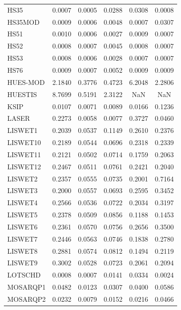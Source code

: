 \begin{longtable}{lccccc}
HS35     &   0.0007 &   0.0005 &   0.0288 &   0.0308 &   0.0008 \\
HS35MOD  &   0.0009 &   0.0006 &   0.0048 &   0.0007 &   0.0307 \\
HS51     &   0.0010 &   0.0006 &   0.0027 &   0.0009 &   0.0007 \\
HS52     &   0.0008 &   0.0007 &   0.0045 &   0.0008 &   0.0007 \\
HS53     &   0.0008 &   0.0006 &   0.0028 &   0.0007 &   0.0007 \\
HS76     &   0.0009 &   0.0007 &   0.0052 &   0.0009 &   0.0009 \\
HUES-MOD &   2.1840 &   0.3776 &   0.4723 &   6.2048 &   2.2806 \\
HUESTIS  &   8.7699 &   0.5191 &   2.3122 &      NaN &      NaN \\
KSIP     &   0.0107 &   0.0071 &   0.0089 &   0.0166 &   0.1236 \\
LASER    &   0.2273 &   0.0058 &   0.0077 &   0.3727 &   0.0460 \\
LISWET1  &   0.2039 &   0.0537 &   0.1149 &   0.2610 &   0.2376 \\
LISWET10 &   0.2189 &   0.0544 &   0.0696 &   0.2318 &   0.2339 \\
LISWET11 &   0.2121 &   0.0502 &   0.0714 &   0.1759 &   0.2063 \\
LISWET12 &   0.2467 &   0.0511 &   0.0761 &   0.2421 &   0.2040 \\
LISWET2  &   0.2357 &   0.0555 &   0.0735 &   0.2001 &   0.7164 \\
LISWET3  &   0.2000 &   0.0557 &   0.0693 &   0.2595 &   0.3452 \\
LISWET4  &   0.2566 &   0.0536 &   0.0722 &   0.2034 &   0.3197 \\
LISWET5  &   0.2378 &   0.0509 &   0.0856 &   0.1188 &   0.1453 \\
LISWET6  &   0.2361 &   0.0570 &   0.0756 &   0.2656 &   0.3500 \\
LISWET7  &   0.2446 &   0.0563 &   0.0746 &   0.1838 &   0.2780 \\
LISWET8  &   0.2881 &   0.0574 &   0.0812 &   0.1494 &   0.2119 \\
LISWET9  &   0.3002 &   0.0528 &   0.0723 &   0.2061 &   0.2094 \\
LOTSCHD  &   0.0008 &   0.0007 &   0.0141 &   0.0334 &   0.0024 \\
MOSARQP1 &   0.0482 &   0.0123 &   0.0307 &   0.0400 &   0.0586 \\
MOSARQP2 &   0.0232 &   0.0079 &   0.0152 &   0.0216 &   0.0466 \\

\end{longtable}
